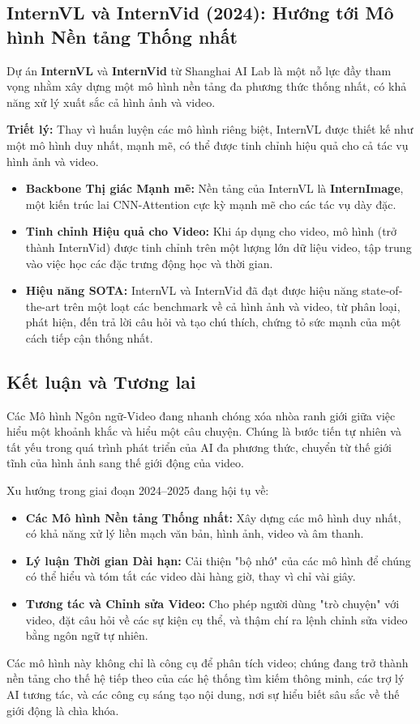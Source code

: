 \subsection{InternVL và InternVid (2024): Hướng tới Mô hình Nền tảng Thống nhất}
\label{subsec:internvid}
Dự án \textbf{InternVL} và \textbf{InternVid} \cite{Chen2024_InternVL} từ Shanghai AI Lab là một nỗ lực đầy tham vọng nhằm xây dựng một mô hình nền tảng đa phương thức thống nhất, có khả năng xử lý xuất sắc cả hình ảnh và video.

\textbf{Triết lý:}
Thay vì huấn luyện các mô hình riêng biệt, InternVL được thiết kế như một mô hình duy nhất, mạnh mẽ, có thể được tinh chỉnh hiệu quả cho cả tác vụ hình ảnh và video.
\begin{itemize}
	\item \textbf{Backbone Thị giác Mạnh mẽ:} Nền tảng của InternVL là \textbf{InternImage}, một kiến trúc lai CNN-Attention cực kỳ mạnh mẽ cho các tác vụ dày đặc.
	\item \textbf{Tinh chỉnh Hiệu quả cho Video:} Khi áp dụng cho video, mô hình (trở thành InternVid) được tinh chỉnh trên một lượng lớn dữ liệu video, tập trung vào việc học các đặc trưng động học và thời gian.
	\item \textbf{Hiệu năng SOTA:} InternVL và InternVid đã đạt được hiệu năng state-of-the-art trên một loạt các benchmark về cả hình ảnh và video, từ phân loại, phát hiện, đến trả lời câu hỏi và tạo chú thích, chứng tỏ sức mạnh của một cách tiếp cận thống nhất.
\end{itemize}

\subsection{Kết luận và Tương lai}
\label{subsec:vlm_conclusion}
Các Mô hình Ngôn ngữ-Video đang nhanh chóng xóa nhòa ranh giới giữa việc hiểu một khoảnh khắc và hiểu một câu chuyện. Chúng là bước tiến tự nhiên và tất yếu trong quá trình phát triển của AI đa phương thức, chuyển từ thế giới tĩnh của hình ảnh sang thế giới động của video.

Xu hướng trong giai đoạn 2024–2025 đang hội tụ về:
\begin{itemize}
	\item \textbf{Các Mô hình Nền tảng Thống nhất:} Xây dựng các mô hình duy nhất, có khả năng xử lý liền mạch văn bản, hình ảnh, video và âm thanh.
	\item \textbf{Lý luận Thời gian Dài hạn:} Cải thiện "bộ nhớ" của các mô hình để chúng có thể hiểu và tóm tắt các video dài hàng giờ, thay vì chỉ vài giây.
	\item \textbf{Tương tác và Chỉnh sửa Video:} Cho phép người dùng "trò chuyện" với video, đặt câu hỏi về các sự kiện cụ thể, và thậm chí ra lệnh chỉnh sửa video bằng ngôn ngữ tự nhiên.
\end{itemize}
Các mô hình này không chỉ là công cụ để phân tích video; chúng đang trở thành nền tảng cho thế hệ tiếp theo của các hệ thống tìm kiếm thông minh, các trợ lý AI tương tác, và các công cụ sáng tạo nội dung, nơi sự hiểu biết sâu sắc về thế giới động là chìa khóa.


